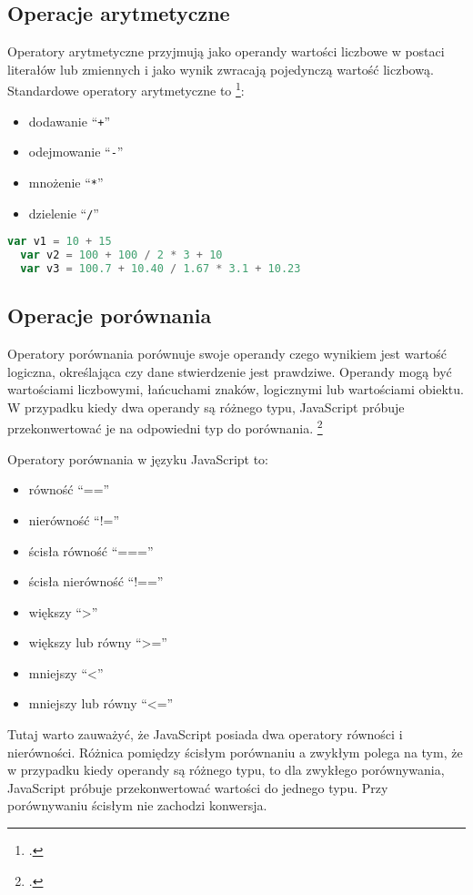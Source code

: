 \subsection{Operacje arytmetyczne}
Operatory arytmetyczne przyjmują jako operandy wartości liczbowe w postaci literałów lub zmiennych i jako wynik zwracają pojedynczą wartość liczbową. Standardowe operatory arytmetyczne to \footcite{jsExpressions_and_Operators}:
\begin{itemize}
  \item dodawanie ``\texttt{+}''
  \item odejmowanie ``\texttt{-}''
  \item mnożenie ``\texttt{*}''
  \item dzielenie ``\texttt{/}''
\end{itemize}

\begin{lstlisting}[language=JavaScript, caption=Przykład użycia operatorów arytmetycznych, label=alg:operatoryArytmetyczne1]
  var v1 = 10 + 15
  var v2 = 100 + 100 / 2 * 3 + 10
  var v3 = 100.7 + 10.40 / 1.67 * 3.1 + 10.23
\end{lstlisting}


\subsection{Operacje porównania}
  \par Operatory porównania porównuje swoje operandy czego wynikiem jest wartość logiczna, określająca czy dane stwierdzenie jest prawdziwe. Operandy mogą być wartościami liczbowymi, łańcuchami znaków, logicznymi lub wartościami obiektu. W przypadku kiedy dwa operandy są różnego typu, JavaScript próbuje przekonwertować je na odpowiedni typ do porównania. \footcite{jsExpressions_and_Operators}
  \par Operatory porównania w języku JavaScript to:
  \begin{itemize}
    \item równość ``==''
    \item nierówność ``!=''
    \item ścisła równość ``===''
    \item ścisła nierówność ``!==''
    \item większy ``>''
    \item większy lub równy ``>=''
    \item mniejszy ``<''
    \item mniejszy lub równy ``<=''
  \end{itemize}
  Tutaj warto zauważyć, że JavaScript posiada dwa operatory równości i nierówności. Różnica pomiędzy ścisłym porównaniu a zwykłym polega na tym, że w przypadku kiedy operandy są różnego typu, to dla zwykłego porównywania, JavaScript próbuje przekonwertować wartości do jednego typu. Przy porównywaniu ścisłym nie zachodzi konwersja.

